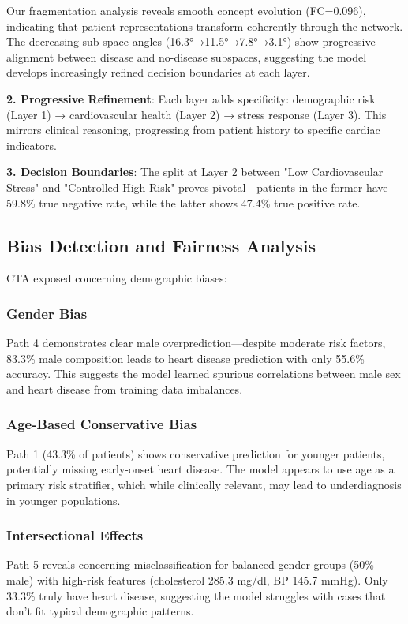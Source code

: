 Our fragmentation analysis reveals smooth concept evolution (FC=0.096), indicating that patient representations transform coherently through the network. The decreasing sub-space angles (16.3°→11.5°→7.8°→3.1°) show progressive alignment between disease and no-disease subspaces, suggesting the model develops increasingly refined decision boundaries at each layer.

\textbf{2. Progressive Refinement}: Each layer adds specificity: demographic risk (Layer 1) → cardiovascular health (Layer 2) → stress response (Layer 3). This mirrors clinical reasoning, progressing from patient history to specific cardiac indicators.

\textbf{3. Decision Boundaries}: The split at Layer 2 between "Low Cardiovascular Stress" and "Controlled High-Risk" proves pivotal—patients in the former have 59.8\% true negative rate, while the latter shows 47.4\% true positive rate.

\subsection{Bias Detection and Fairness Analysis}

CTA exposed concerning demographic biases:

\subsubsection{Gender Bias}
Path 4 demonstrates clear male overprediction—despite moderate risk factors, 83.3\% male composition leads to heart disease prediction with only 55.6\% accuracy. This suggests the model learned spurious correlations between male sex and heart disease from training data imbalances.

\subsubsection{Age-Based Conservative Bias}
Path 1 (43.3\% of patients) shows conservative prediction for younger patients, potentially missing early-onset heart disease. The model appears to use age as a primary risk stratifier, which while clinically relevant, may lead to underdiagnosis in younger populations.

\subsubsection{Intersectional Effects}
Path 5 reveals concerning misclassification for balanced gender groups (50\% male) with high-risk features (cholesterol 285.3 mg/dl, BP 145.7 mmHg). Only 33.3\% truly have heart disease, suggesting the model struggles with cases that don't fit typical demographic patterns.

